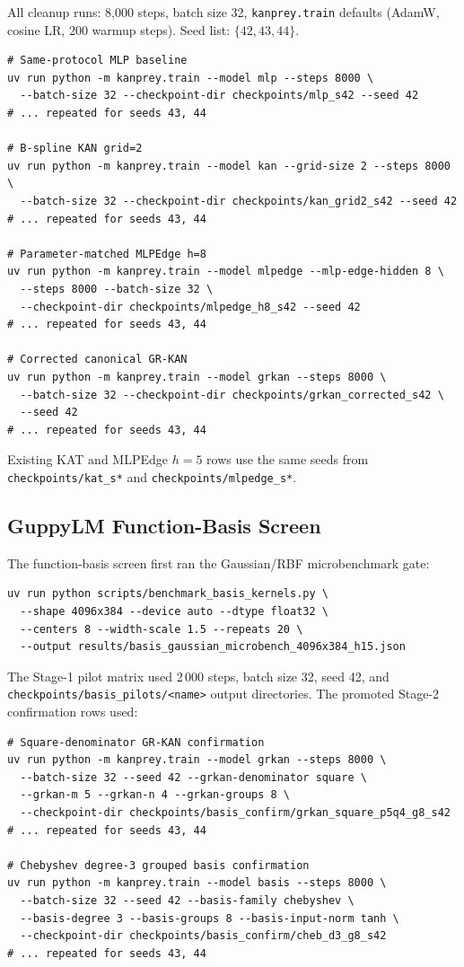 \documentclass{article}
\begin{document}
All cleanup runs: 8,000 steps, batch size 32, \texttt{kanprey.train} defaults
(AdamW, cosine LR, 200 warmup steps). Seed list: $\{42, 43, 44\}$.

\begin{verbatim}
# Same-protocol MLP baseline
uv run python -m kanprey.train --model mlp --steps 8000 \
  --batch-size 32 --checkpoint-dir checkpoints/mlp_s42 --seed 42
# ... repeated for seeds 43, 44

# B-spline KAN grid=2
uv run python -m kanprey.train --model kan --grid-size 2 --steps 8000 \
  --batch-size 32 --checkpoint-dir checkpoints/kan_grid2_s42 --seed 42
# ... repeated for seeds 43, 44

# Parameter-matched MLPEdge h=8
uv run python -m kanprey.train --model mlpedge --mlp-edge-hidden 8 \
  --steps 8000 --batch-size 32 \
  --checkpoint-dir checkpoints/mlpedge_h8_s42 --seed 42
# ... repeated for seeds 43, 44

# Corrected canonical GR-KAN
uv run python -m kanprey.train --model grkan --steps 8000 \
  --batch-size 32 --checkpoint-dir checkpoints/grkan_corrected_s42 \
  --seed 42
# ... repeated for seeds 43, 44
\end{verbatim}

Existing KAT and MLPEdge $h=5$ rows use the same seeds from \texttt{checkpoints/kat\_s*} and
\texttt{checkpoints/mlpedge\_s*}.

\subsection{GuppyLM Function-Basis Screen}

The function-basis screen first ran the Gaussian/RBF microbenchmark gate:
\begin{verbatim}
uv run python scripts/benchmark_basis_kernels.py \
  --shape 4096x384 --device auto --dtype float32 \
  --centers 8 --width-scale 1.5 --repeats 20 \
  --output results/basis_gaussian_microbench_4096x384_h15.json
\end{verbatim}

The Stage-1 pilot matrix used 2\,000 steps, batch size 32, seed 42, and
\texttt{checkpoints/basis\_pilots/<name>} output directories.
The promoted Stage-2 confirmation rows used:
\begin{verbatim}
# Square-denominator GR-KAN confirmation
uv run python -m kanprey.train --model grkan --steps 8000 \
  --batch-size 32 --seed 42 --grkan-denominator square \
  --grkan-m 5 --grkan-n 4 --grkan-groups 8 \
  --checkpoint-dir checkpoints/basis_confirm/grkan_square_p5q4_g8_s42
# ... repeated for seeds 43, 44

# Chebyshev degree-3 grouped basis confirmation
uv run python -m kanprey.train --model basis --steps 8000 \
  --batch-size 32 --seed 42 --basis-family chebyshev \
  --basis-degree 3 --basis-groups 8 --basis-input-norm tanh \
  --checkpoint-dir checkpoints/basis_confirm/cheb_d3_g8_s42
# ... repeated for seeds 43, 44
\end{verbatim}
\end{document}
